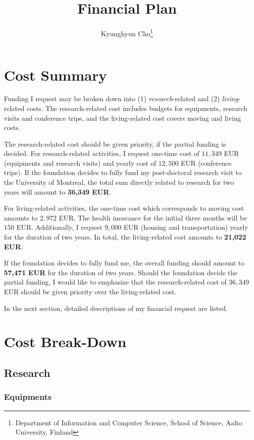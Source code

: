 \documentclass[11pt, oneside]{essay}
\title{Financial Plan}
\author{Kyunghyun Cho\thanks{Department of Information and
    Computer Science, School of Science, Aalto University,
             Finland}}
\begin{document}
\maketitle

\section{Cost Summary}

Funding I request may be broken down into (1)
\textit{research}-related and (2) \textit{living}-related
costs. The research-related cost includes budgets for equipments,
research visits and conference trips, and the living-related
cost covers moving and living costs.

The research-related cost should be given priority, if the
partial funding is decided. For research-related activities, I
request one-time cost of $11,349$ EUR (equipments and research
visits) and yearly cost of $12,500$ EUR (conference trips). If
the foundation decides to fully fund my post-doctoral research
visit to the University of Montreal, the total sum directly
related to research for two years will amount to \textbf{36,349
EUR}.

For living-related activities, the one-time cost which
corresponds to moving cost amounts to $2,972$ EUR. The health
insurance for the initial three months will be $150$ EUR.
Additionally, I request $9,000$ EUR (housing and transportation)
yearly for the duration of two years. In total, the
living-related cost amounts to \textbf{21,022 EUR}.

If the foundation decides to fully fund me, the overall funding
should amount to \textbf{57,471 EUR} for the duration of two
years. Should the foundation decide the partial funding, I would
like to emphasize that the research-related cost of $36,349$ EUR
should be given priority over the living-related cost.

In the next section, detailed descriptions of my financial
request are listed.


\section{Cost Break-Down}

\subsection{Research}

\subsubsection{Equipments}
\end{document}
